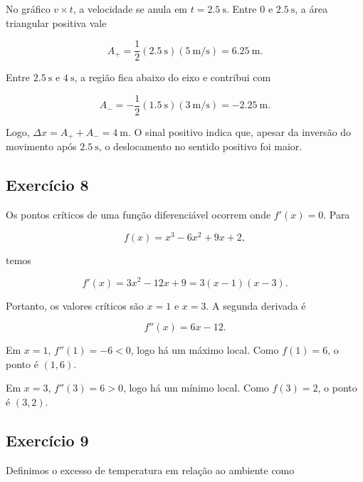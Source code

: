 No gráfico \(v\times t\), a velocidade se anula em \(t=\SI{2.5}{\second}\). Entre \(0\) e \(\SI{2.5}{\second}\), a área triangular positiva vale

\begin{equation}
  A_+=\frac{1}{2}(\SI{2.5}{\second})(\SI{5}{\meter\per\second})
  =\SI{6.25}{\meter}.
\end{equation}

Entre \(\SI{2.5}{\second}\) e \(\SI{4}{\second}\), a região fica abaixo do eixo e contribui com

\begin{equation}
  A_-=-\frac{1}{2}(\SI{1.5}{\second})(\SI{3}{\meter\per\second})
  =-\SI{2.25}{\meter}.
\end{equation}

Logo, \(\Delta x=A_++A_-=\SI{4}{\meter}\). O sinal positivo indica que, apesar da inversão do movimento após \(\SI{2.5}{\second}\), o deslocamento no sentido positivo foi maior.

\subsection*{Exercício 8}

Os pontos críticos de uma função diferenciável ocorrem onde \(f'(x)=0\). Para

\begin{equation}
  f(x)=x^3-6x^2+9x+2,
\end{equation}

temos

\begin{equation}
  f'(x)=3x^2-12x+9=3(x-1)(x-3).
\end{equation}

Portanto, os valores críticos são \(x=1\) e \(x=3\). A segunda derivada é

\begin{equation}
  f''(x)=6x-12.
\end{equation}

Em \(x=1\), \(f''(1)=-6<0\), logo há um máximo local. Como \(f(1)=6\), o ponto é \(\boxed{(1,6)}\).

Em \(x=3\), \(f''(3)=6>0\), logo há um mínimo local. Como \(f(3)=2\), o ponto é \(\boxed{(3,2)}\).

\subsection*{Exercício 9}

Definimos o excesso de temperatura em relação ao ambiente como

